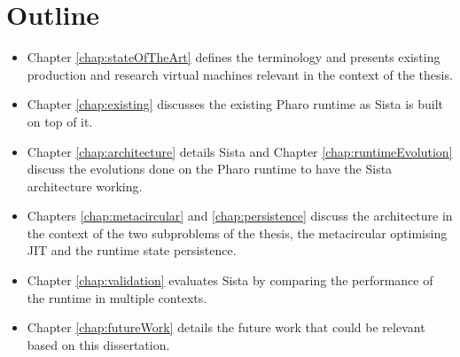 \documentclass[a4paper,12pt,twoside]{../includes/ThesisStyle}
\begin{document}
\section{Outline}

\begin{itemize}
	\item Chapter \ref{chap:stateOfTheArt} defines the terminology and presents existing production and research virtual machines relevant in the context of the thesis. 
	\item Chapter \ref{chap:existing} discusses the existing Pharo runtime as Sista is built on top of it.
	\item Chapter \ref{chap:architecture} details Sista and Chapter \ref{chap:runtimeEvolution} discuss the evolutions done on the Pharo runtime to have the Sista architecture working.
	\item Chapters \ref{chap:metacircular} and \ref{chap:persistence} 
	discuss the architecture in the context of the two subproblems of the thesis, the metacircular optimising JIT and the runtime state persistence. 
	\item Chapter \ref{chap:validation} evaluates Sista by comparing the performance of the runtime in multiple contexts.
	\item Chapter \ref{chap:futureWork} details the future work that could be relevant based on this dissertation.
\end{itemize}



\ifx\wholebook\relax\else
    
\end{document}
